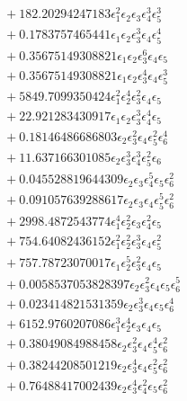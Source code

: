 \documentclass[10pt]{article}
\begin{document}
\begin{align*}
&{}  + 182.20294247183 \epsilon_{1}^{2} \epsilon_{2} \epsilon_{3} \epsilon_{4}^{3} \epsilon_{5}^{3} \\
&{}  + 0.1783757465441 \epsilon_{1} \epsilon_{2} \epsilon_{3}^{3} \epsilon_{4} \epsilon_{5}^{4} \\
&{}  + 0.35675149308821 \epsilon_{1} \epsilon_{2} \epsilon_{3}^{6} \epsilon_{4} \epsilon_{5} \\
&{}  + 0.35675149308821 \epsilon_{1} \epsilon_{2} \epsilon_{3}^{4} \epsilon_{4} \epsilon_{5}^{3} \\
&{}  + 5849.7099350424 \epsilon_{1}^{2} \epsilon_{2}^{4} \epsilon_{3}^{2} \epsilon_{4} \epsilon_{5} \\
&{}  + 22.921283430917 \epsilon_{1} \epsilon_{2} \epsilon_{3}^{3} \epsilon_{4}^{4} \epsilon_{5} \\
&{}  + 0.18146486686803 \epsilon_{2} \epsilon_{3}^{2} \epsilon_{4} \epsilon_{5}^{2} \epsilon_{6}^{4} \\
&{}  + 11.637166301085 \epsilon_{2} \epsilon_{3}^{3} \epsilon_{4}^{3} \epsilon_{5}^{2} \epsilon_{6} \\
&{}  + 0.045528819644309 \epsilon_{2} \epsilon_{3} \epsilon_{4}^{5} \epsilon_{5} \epsilon_{6}^{2} \\
&{}  + 0.091057639288617 \epsilon_{2} \epsilon_{3} \epsilon_{4} \epsilon_{5}^{5} \epsilon_{6}^{2} \\
&{}  + 2998.4872543774 \epsilon_{1}^{4} \epsilon_{2}^{2} \epsilon_{3} \epsilon_{4}^{2} \epsilon_{5} \\
&{}  + 754.64082436152 \epsilon_{1}^{2} \epsilon_{2}^{2} \epsilon_{3}^{3} \epsilon_{4} \epsilon_{5}^{2} \\
&{}  + 757.78723070017 \epsilon_{1} \epsilon_{2}^{5} \epsilon_{3}^{2} \epsilon_{4} \epsilon_{5} \\
&{}  + 0.0058537053828397 \epsilon_{2} \epsilon_{3}^{2} \epsilon_{4} \epsilon_{5} \epsilon_{6}^{5} \\
&{}  + 0.023414821531359 \epsilon_{2} \epsilon_{3}^{3} \epsilon_{4} \epsilon_{5} \epsilon_{6}^{4} \\
&{}  + 6152.9760207086 \epsilon_{1}^{3} \epsilon_{2}^{4} \epsilon_{3} \epsilon_{4} \epsilon_{5} \\
&{}  + 0.38049084988458 \epsilon_{2} \epsilon_{3}^{2} \epsilon_{4} \epsilon_{5}^{4} \epsilon_{6}^{2} \\
&{}  + 0.38244208501219 \epsilon_{2} \epsilon_{3}^{4} \epsilon_{4} \epsilon_{5}^{2} \epsilon_{6}^{2} \\
&{}  + 0.76488417002439 \epsilon_{2} \epsilon_{3}^{4} \epsilon_{4}^{2} \epsilon_{5} \epsilon_{6}^{2} \\

\end{align*}
\end{document}
